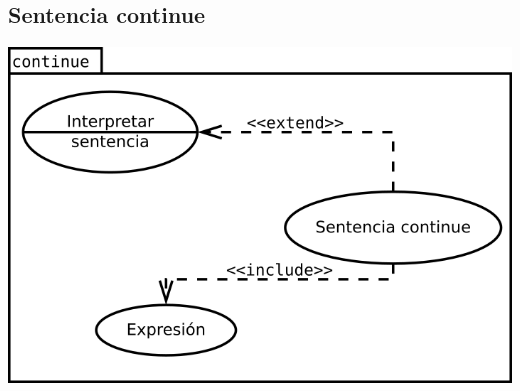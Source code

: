 \subsection {Sentencia continue}
\begin{center}
\includegraphics[scale=0.4]{continue.png} \\
\end{center}

